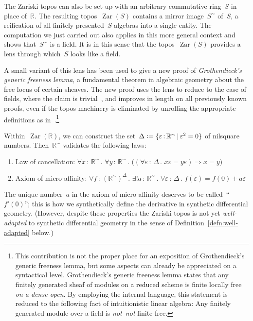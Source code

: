 \documentclass[graybox]{svmult}
\newcommand{\RR}{\mathbb{R}}
\newcommand{\defeq}{\vcentcolon=}
\DeclareMathOperator{\Zar}{Zar}
\renewcommand{\_}{\mathpunct{.}\,}
\newcommand{\?}{\,{:}\,}
\newcommand{\notnot}{\emph{not~not}\xspace}
\begin{document}
\begin{remark}The Zariski topos can also be set up with an arbitrary commutative
ring~$S$ in place of~$\RR$. The resulting topos~$\Zar(S)$ contains a mirror
image~$S^\sim$ of~$S$, a reification of all finitely presented~$S$-algebras into a
single entity. The computation we just carried out also applies in this
more general context and shows that~$S^\sim$ is a field. It is in this sense that the
topos~$\Zar(S)$ provides a lens through which~$S$ looks like a field.

A small variant of this lens has been used to give a new proof of
\emph{Grothendieck's generic freeness lemma}, a fundamental theorem in
algebraic geometry about the free locus of certain sheaves. The new proof uses the lens to reduce to the case
of fields, where the claim is trivial~\cite[Section~11.5]{blechschmidt:phd},
and improves in length on all previously known proofs, even if the topos
machinery is eliminated by unrolling the appropriate
definitions as in~\cite{blechschmidt:generic-freeness}.\footnote{This contribution is
not the proper place for an exposition of Grothendieck's generic freeness
lemma, but some aspects can already be appreciated on a syntactical level.
Grothendieck's generic freeness lemma states that any finitely generated sheaf
of modules on a reduced scheme is finite locally free \emph{on a dense open}.
By employing the internal language, this statement is reduced to the following
fact of intuitionistic linear algebra: Any finitely generated module over a
field is \notnot finite free.}
\end{remark}

Within~$\Zar(\RR)$, we can construct the set~$\Delta \defeq \{ \varepsilon \? \RR^\sim \,|\,
\varepsilon^2 = 0 \}$ of nilsquare numbers. Then~$\RR^\sim$ validates the following laws:
\begin{enumerate}
\item Law of cancellation: $\forall x \? \RR^\sim\_ \forall y \? \RR^\sim\_ \bigl((\forall
\varepsilon \? \Delta\_ x\varepsilon = y\varepsilon)
\Rightarrow x = y\bigr)$
\item Axiom of micro-affinity: $\forall f \? (\RR^\sim)^\Delta\_ \exists! a \? \RR^\sim\_
\forall \varepsilon \? \Delta\_ f(\varepsilon) = f(0) + a\varepsilon$
\end{enumerate}
The unique number~$a$ in the axiom of micro-affinity deserves to be
called~``$f'(0)$''; this is how we synthetically define the derivative in
synthetic differential geometry. (However, despite these properties the Zariski
topos is not yet \emph{well-adapted} to synthetic differential geometry in the
sense of Definition~\ref{defn:well-adapted} below.)
\end{document}
